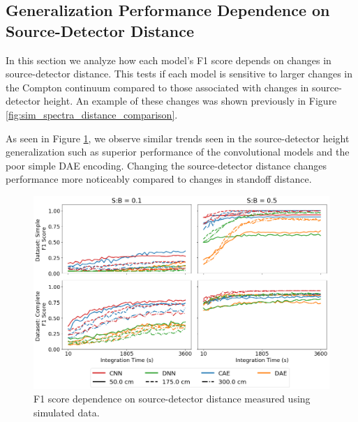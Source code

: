 \subsection{Generalization Performance Dependence on Source-Detector Distance}

In this section we analyze how each model's F1 score depends on changes in source-detector distance. This tests if each model is sensitive to larger changes in the Compton continuum compared to those associated with changes in source-detector height. An example of these changes was shown previously in Figure \ref{fig:sim_spectra_distance_comparison}.

As seen in Figure \ref{fig:sim-generalization-dist}, we observe similar trends seen in the source-detector height generalization such as superior performance of the convolutional models and the poor simple DAE encoding. Changing the source-detector distance changes performance more noticeably compared to changes in standoff distance.


\begin{figure}[H]
	\centering
	\includegraphics[width=1.0\linewidth]{images/sim-generalization-dist}
	\caption{F1 score dependence on source-detector distance measured using simulated data.}
	\label{fig:sim-generalization-dist}
\end{figure}


